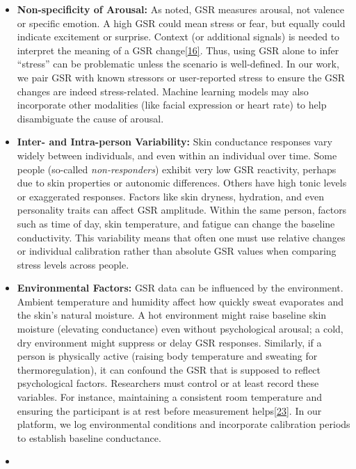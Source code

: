 \documentclass[12pt,a4paper]{article}
\begin{document}
\begin{itemize}
\item
  \textbf{Non-specificity of Arousal:} As noted, GSR measures arousal, not valence or specific emotion. A high GSR could mean stress or fear, but equally could indicate excitement or surprise. Context (or additional signals) is needed to interpret the meaning of a GSR change\href{Boucsein2012}{{[}16{]}}. Thus, using GSR alone to infer ``stress'' can be problematic unless the scenario is well-defined. In our work, we pair GSR with known stressors or user-reported stress to ensure the GSR changes are indeed stress-related. Machine learning models may also incorporate other modalities (like facial expression or heart rate) to help disambiguate the cause of arousal.
\item
  \textbf{Inter- and Intra-person Variability:} Skin conductance responses vary widely between individuals, and even within an individual over time. Some people (so-called \emph{non-responders}) exhibit very low GSR reactivity, perhaps due to skin properties or autonomic differences. Others have high tonic levels or exaggerated responses. Factors like skin dryness, hydration, and even personality traits can affect GSR amplitude. Within the same person, factors such as time of day, skin temperature, and fatigue can change the baseline conductivity. This variability means that often one must use relative changes or individual calibration rather than absolute GSR values when comparing stress levels across people.
\item
  \textbf{Environmental Factors:} GSR data can be influenced by the environment. Ambient temperature and humidity affect how quickly sweat evaporates and the skin's natural moisture. A hot environment might raise baseline skin moisture (elevating conductance) even without psychological arousal; a cold, dry environment might suppress or delay GSR responses. Similarly, if a person is physically active (raising body temperature and sweating for thermoregulation), it can confound the GSR that is supposed to reflect psychological factors. Researchers must control or at least record these variables. For instance, maintaining a consistent room temperature and ensuring the participant is at rest before measurement helps\href{Boucsein2012}{{[}23{]}}. In our platform, we log environmental conditions and incorporate calibration periods to establish baseline conductance.
\item

\end{itemize}
\end{document}
